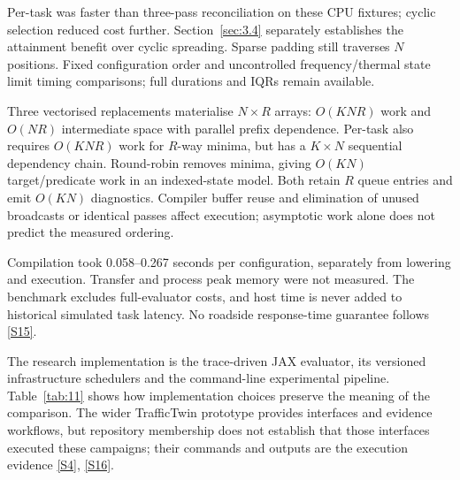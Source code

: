 \documentclass[11pt,a4paper]{article}
\begin{document}
Per-task was faster than three-pass reconciliation on these CPU fixtures; cyclic selection reduced cost further. Section~\ref{sec:3.4} separately establishes the attainment benefit over cyclic spreading. Sparse padding still traverses $N$ positions. Fixed configuration order and uncontrolled frequency/thermal state limit timing comparisons; full durations and IQRs remain available.

Three vectorised replacements materialise $N\times R$ arrays: $O(KNR)$ work and $O(NR)$ intermediate space with parallel prefix dependence. Per-task also requires $O(KNR)$ work for $R$-way minima, but has a $K\times N$ sequential dependency chain. Round-robin removes minima, giving $O(KN)$ target/predicate work in an indexed-state model. Both retain $R$ queue entries and emit $O(KN)$ diagnostics. Compiler buffer reuse and elimination of unused broadcasts or identical passes affect execution; asymptotic work alone does not predict the measured ordering.

Compilation took 0.058--0.267 seconds per configuration, separately from lowering and execution. Transfer and process peak memory were not measured. The benchmark excludes full-evaluator costs, and host time is never added to historical simulated task latency. No roadside response-time guarantee follows \hyperref[source-s15]{[S15]}.

The research implementation is the trace-driven JAX evaluator, its versioned infrastructure schedulers and the command-line experimental pipeline. Table~\ref{tab:11} shows how implementation choices preserve the meaning of the comparison. The wider TrafficTwin prototype provides interfaces and evidence workflows, but repository membership does not establish that those interfaces executed these campaigns; their commands and outputs are the execution evidence \hyperref[source-s4]{[S4]}, \hyperref[source-s16]{[S16]}.
\end{document}
